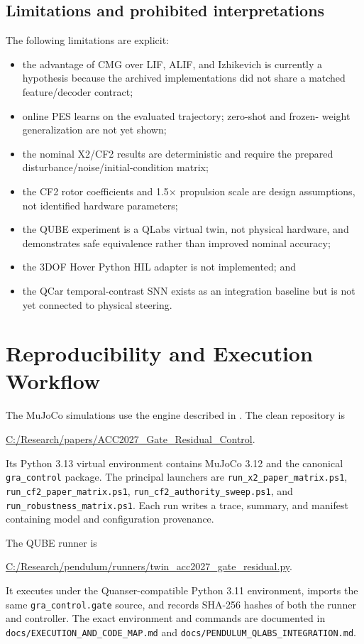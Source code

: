 \documentclass[10pt,twocolumn]{article}
\begin{document}
\subsection{Limitations and prohibited interpretations}

The following limitations are explicit:
\begin{itemize}
    \item the advantage of CMG over LIF, ALIF, and Izhikevich is currently a
    hypothesis because the archived implementations did not share a matched
    feature/decoder contract;
    \item online PES learns on the evaluated trajectory; zero-shot and frozen-
    weight generalization are not yet shown;
    \item the nominal X2/CF2 results are deterministic and require the prepared
    disturbance/noise/initial-condition matrix;
    \item the CF2 rotor coefficients and 1.5$\times$ propulsion scale are design
    assumptions, not identified hardware parameters;
    \item the QUBE experiment is a QLabs virtual twin, not physical hardware,
    and demonstrates safe equivalence rather than improved nominal accuracy;
    \item the 3DOF Hover Python HIL adapter is not implemented; and
    \item the QCar temporal-contrast SNN exists as an integration baseline but
    is not yet connected to physical steering.
\end{itemize}

\section{Reproducibility and Execution Workflow}

The MuJoCo simulations use the engine described in \cite{todorov2012mujoco}.
The clean repository is
\begin{center}
\url{C:/Research/papers/ACC2027_Gate_Residual_Control}.
\end{center}
Its Python 3.13 virtual environment contains MuJoCo 3.12 and the canonical
\texttt{gra\_control} package. The principal launchers are
\texttt{run\_x2\_paper\_matrix.ps1},
\texttt{run\_cf2\_paper\_matrix.ps1},
\texttt{run\_cf2\_authority\_sweep.ps1}, and
\texttt{run\_robustness\_matrix.ps1}. Each run writes a trace, summary, and
manifest containing model and configuration provenance.

The QUBE runner is
\begin{center}
\url{C:/Research/pendulum/runners/twin_acc2027_gate_residual.py}.
\end{center}
It executes under the Quanser-compatible Python 3.11 environment, imports the
same \texttt{gra\_control.gate} source, and records SHA-256 hashes of both the
runner and controller. The exact environment and commands are documented in
\texttt{docs/EXECUTION\_AND\_CODE\_MAP.md} and
\texttt{docs/PENDULUM\_QLABS\_INTEGRATION.md}.
\end{document}
